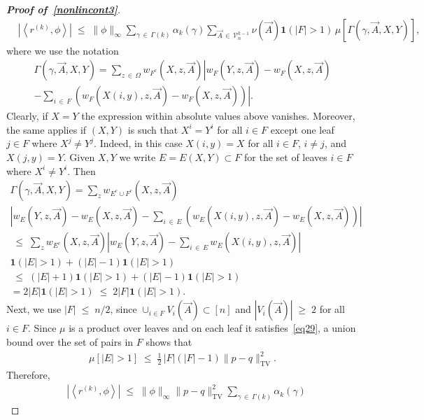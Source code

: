 \documentclass[AHL,Unicode,longabstracts,published]{cedram}
\renewcommand{\leq}{\;\leqslant\;}
\renewcommand{\geq}{\;\geqslant\;}
\newcommand{\tv}{\mathrm{TV}}
\newcommand{\ind}{\mathbf{1}}
\newcommand{\cV}{\mathcal{V}}
\let\g=\gamma
\let\G=\Gamma
\let\O=\Omega
\begin{document}
\begin{proof}[{\bf Proof of~\eqref{nonlincont3}}]
\begin{align}\label{eq2a85}
& \left|\left\langle r^{(k)},\phi\right\rangle\right|\leq \|\phi\|_\infty\sum_{\gamma\,\in\,\Gamma(k)}\alpha_k(\gamma)
\sum_{\vec A\,\in\,\cV_n^{k-1}} \nu(\vec A)\ind(|F|>1)
\,\mu\left[\G\left(\g,\vec A,X,Y\right)\right],
\end{align}
where we use the notation
\begin{multline}
\G\left(\g,\vec A,X,Y\right)
= \sum_{z\,\in\,\O} w_{F^c} \left(X,z,\vec A\right)\left|w_F \left(Y,z,\vec A\right)-w_F \left(X,z,\vec A\right)\right. \\
\left. -\sum_{i\,\in\,F}
\left(w_{F}\left(X(i,y),z,\vec A\right) - w_{F}\left(X,z,\vec A\right)
\right)\right|.
\end{multline}
Clearly, if $X=Y$ the expression within absolute values above vanishes. Moreover, the same applies if $(X,Y)$ is such that $X^i=Y^i$ for all $i\in F$ except one leaf $j\in F$ where $X^j\neq Y^j$. Indeed, in this case $X(i,y)=X$ for all $i\in F$, $i\neq j$, and $X(j,y)=Y$. Given $X,Y$ we write $E=E(X,Y)\subset F$ for the set of leaves $i\in F$ where $X^i\neq Y^i$. Then
\begin{multline}\label{abbao}
\G\left(\g,\vec A,X,Y\right)=\sum_z w_{E^c\cup F^c} \left(X,z,\vec A\right)\\
\left|w_E \left(Y,z,\vec A\right)-w_E \left(X,z,\vec A\right)-\sum_{i\,\in\,E}
\left(w_{E}\left(X(i,y),z,\vec A\right) - w_{E}\left(X,z,\vec A\right)\right)\right|\\
 \leq \sum_z w_{E^c} \left(X,z,\vec A\right)\left|w_E \left(Y,z,\vec A\right)-\sum_{i\,\in\,E} w_{E}\left(X(i,y),z,\vec A\right)\right|\\
\ind(|E|>1)+ (|E|-1)\ind(|E|>1)\\
\leq (|E|+1)\ind(|E|>1)+ (|E|-1)\ind(|E|>1) 
\\ = 2|E|\ind(|E|>1) \leq 2|F|\ind(|E|>1).
\end{multline}
Next, we use $|F|\leq n/2$, since $\cup_{i\in F}V_i(\vec A)\subset [n]$ and $|V_i(\vec A)|\geq 2$ for all $i\in F$. Since $\mu$ is a product over leaves and on each leaf it satisfies~\eqref{eq29}, a union bound over the set of pairs in $F$ shows that
\begin{align}\label{eqa128}
\mu\left[|E|>1\right]\leq \tfrac12\,|F|(|F|-1)\|p-q\|_{\tv}^2.
\end{align}
Therefore,
\begin{align}\label{eq2a86}
& \left|\left\langle r^{(k)},\phi\right\rangle\right|\leq \|\phi\|_\infty \|p-q\|_{\tv}^2\sum_{\gamma\,\in\,\Gamma(k)}\alpha_k(\gamma)

\end{align}
\end{proof}
\end{document}
